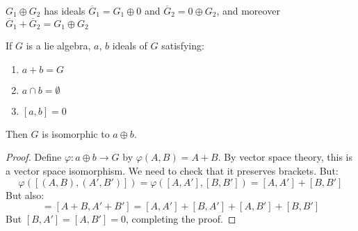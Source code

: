\documentclass[crop=false,class=article]{standalone}                           %
\begin{document}
        $G_{1}\oplus{G}_{2}$ has ideals $\overline{G}_{1}=G_{1}\oplus{0}$ and
        $\overline{G}_{2}=0\oplus{G}_{2}$, and moreover
        $\overline{G}_{1}+\overline{G}_{2}=G_{1}\oplus{G}_{2}$
        \begin{theorem}
            If $G$ is a lie algebra, $a$, $b$ ideals of $G$ satisfying:
            \begin{enumerate}
                \item $a+b=G$
                \item $a\cap{b}=\emptyset$
                \item $[a,b]=0$
            \end{enumerate}
            Then $G$ is isomorphic to $a\oplus{b}$.
        \end{theorem}
        \begin{proof}
            Define $\varphi:a\oplus{b}\rightarrow{G}$ by
            $\varphi(A,B)=A+B$. By vector space theory, this is a vector
            space isomorphism. We need to check that it preserves brackets.
            But:
            \begin{equation}
                \varphi([(A,B),(A',B')])=\varphi([A,A'],[B,B'])
                =[A,A']+[B,B']
            \end{equation}
            But also:
            \begin{equation}
                [\varphi(A,B),\varphi(A',B')]=[A+B,A'+B']
                =[A,A']+[B,A']+[A,B']+[B,B']
            \end{equation}
            But $[B,A']=[A,B']=0$, completing the proof.
        \end{proof}
\end{document}
